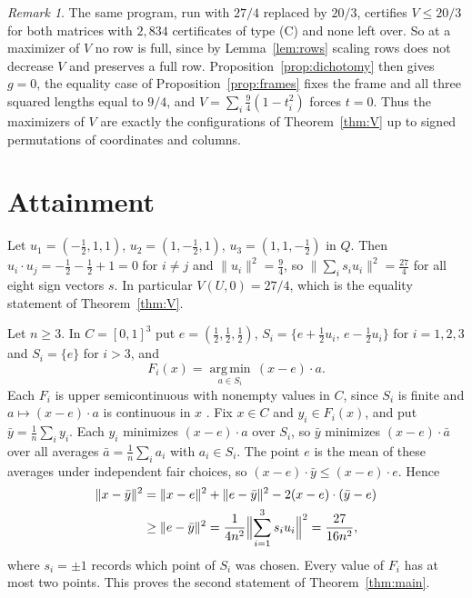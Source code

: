\documentclass[11pt]{amsart}
\theoremstyle{remark}
\newtheorem{rem}[thm]{Remark}
\numberwithin{equation}{section}
\begin{document}
\begin{rem}\label{rem:strict}
The same program, run with $27/4$ replaced by $20/3$, certifies $V\le20/3$ for both matrices with $2{,}834$ certificates of type (C) and none left over. So at a maximizer of $V$ no row is full, since by Lemma~\ref{lem:rows} scaling rows does not decrease $V$ and preserves a full row. Proposition~\ref{prop:dichotomy} then gives $g=0$, the equality case of Proposition~\ref{prop:frames} fixes the frame and all three squared lengths equal to $9/4$, and $V=\sum_i\frac94(1-t_i^2)$ forces $t=0$. Thus the maximizers of $V$ are exactly the configurations of Theorem~\ref{thm:V} up to signed permutations of coordinates and columns.
\end{rem}

\section{Attainment}\label{sec:attain}

Let $u_1=(-\frac12,1,1)$, $u_2=(1,-\frac12,1)$, $u_3=(1,1,-\frac12)$ in $Q$. Then $u_i\cdot u_j=-\frac12-\frac12+1=0$ for $i\ne j$ and $\|u_i\|^2=\frac94$, so $\|\sum_is_iu_i\|^2=\frac{27}4$ for all eight sign vectors $s$. In particular $V(U,0)=27/4$, which is the equality statement of Theorem~\ref{thm:V}.

Let $n\ge3$. In $C=[0,1]^3$ put $e=(\frac12,\frac12,\frac12)$, $S_i=\{e+\frac12u_i,\,e-\frac12u_i\}$ for $i=1,2,3$ and $S_i=\{e\}$ for $i>3$, and
\[
F_i(x)=\operatorname*{arg\,min}_{a\in S_i}\,(x-e)\cdot a.
\]
Each $F_i$ is upper semicontinuous with nonempty values in $C$, since $S_i$ is finite and $a\mapsto(x-e)\cdot a$ is continuous in $x$ \cite[Theorem~17.31]{AliprantisBorder}. Fix $x\in C$ and $y_i\in F_i(x)$, and put $\bar y=\frac1n\sum_iy_i$. Each $y_i$ minimizes $(x-e)\cdot a$ over $S_i$, so $\bar y$ minimizes $(x-e)\cdot\bar a$ over all averages $\bar a=\frac1n\sum_ia_i$ with $a_i\in S_i$. The point $e$ is the mean of these averages under independent fair choices, so $(x-e)\cdot\bar y\le(x-e)\cdot e$. Hence
\[
\begin{aligned}
\|x-\bar y\|^2&=\|x-e\|^2+\|e-\bar y\|^2-2(x-e)\cdot(\bar y-e)\\
&\ge\|e-\bar y\|^2=\frac1{4n^2}\Bigl\|\sum_{i=1}^3s_iu_i\Bigr\|^2=\frac{27}{16n^2},
\end{aligned}
\]
where $s_i=\pm1$ records which point of $S_i$ was chosen. Every value of $F_i$ has at most two points. This proves the second statement of Theorem~\ref{thm:main}.
\end{document}
